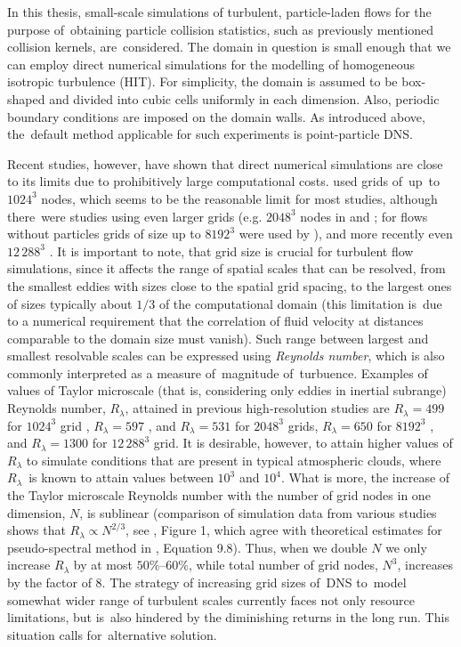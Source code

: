 \documentclass{pracamgren}
\begin{document}
\smallskip

In this thesis, small-scale simulations of turbulent, particle-laden flows for the purpose of~obtaining particle collision statistics, such as previously mentioned collision kernels, are~considered.
The domain in question is small enough that we can employ direct numerical simulations for the modelling of homogeneous isotropic turbulence (HIT).
For simplicity, the domain is assumed to be box-shaped and divided into cubic cells uniformly in each dimension.
Also, periodic boundary conditions are imposed on the domain walls.
As introduced above, the~default method applicable for such experiments is point-particle DNS.

Recent studies, however, have shown that direct numerical simulations are close to its limits due to prohibitively large computational costs.
\textcite{Rosa2013,Rosa2016} used grids of~up~to $1024^3$ nodes, which seems to be the reasonable limit for most studies, although there~were studies using even larger grids (e.g. $2048^3$ nodes in \textcite{Ireland2016} and \textcite{Matsuda2021}; for flows without particles grids of size up to $8192^3$ were used by \textcite{Buaria2019}), and more recently even $12\,288^{3}$ \parencite{Buaria2020}.
It is important to note, that grid size is crucial for turbulent flow simulations, since it affects the range of spatial scales that can be resolved, from the smallest eddies with sizes close to the spatial grid spacing, to the largest ones of sizes typically about $1/3$ of the computational domain (this limitation is~due to a numerical requirement that the correlation of fluid velocity at distances comparable to the domain size must vanish).
Such range between largest and smallest resolvable scales can be expressed using \emph{Reynolds number}, which is also commonly interpreted as a measure of~magnitude of~turbuence.
Examples of values of Taylor microscale (that is, considering only eddies in inertial subrange) Reynolds number, $R_{\lambda}$, attained in previous high-resolution studies are $R_{\lambda} = 499$ for $1024^3$ grid \parencite{Rosa2013,Rosa2016}, $R_{\lambda} = 597$ \parencite{Ireland2016}, and $R_{\lambda} = 531$ \parencite{Matsuda2021} for $2048^3$ grids, $R_{\lambda} = 650$ for $8192^3$ \parencite{Buaria2019}, and $R_{\lambda} = 1300$ for $12\,288^3$ grid.
It is desirable, however, to attain higher values of $R_{\lambda}$ to simulate conditions that are present in typical atmospheric clouds, where $R_{\lambda}$~is known to attain values between $10^{3}$ and $10^{4}$.
What is more, the increase of the Taylor microscale Reynolds number with the number of grid nodes in one dimension, $N$, is sublinear (comparison of simulation data from various studies shows that $R_{\lambda} \propto N^{2/3}$, see \cite{Wang2009}, Figure 1, which agree with theoretical estimates for pseudo-spectral method in \cite{Pope2000}, Equation 9.8).
Thus, when we double $N$ we only increase $R_{\lambda}$ by at most $50\% \text{--} 60\%$, while total number of grid nodes, $N^3$, increases by the factor of $8$.
The strategy of increasing grid sizes of~DNS to~model somewhat wider range of turbulent scales currently faces not only resource limitations, but is~also hindered by the diminishing returns in the long run.
This situation calls for~alternative solution.
\end{document}
